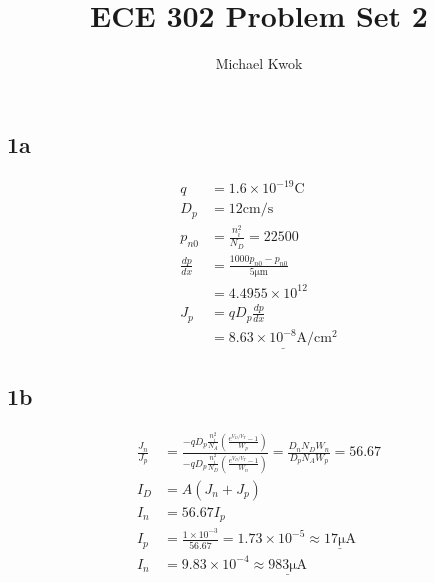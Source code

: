 \documentclass{article}
\title{ECE 302 Problem Set 2}
\author{Michael Kwok}
\begin{document}
\maketitle
\begin{multicols}{2}
    \subsection*{1a}
    \begin{align*}
        q             & = 1.6 \times 10^{-19}\si{\coulomb}                                    \\
        D_p           & = 12 \si{\centi\metre\per\second}                                     \\
        p_{n0}        & = \frac{n_i^2}{N_D} = 22500                                           \\
        \frac{dp}{dx} & = \frac{1000 p_{n0} - p_{n0}}{5\si{\micro\metre}}                     \\
                      & = 4.4955\times 10^{12}                                                \\
        J_p           & = q D_p \frac{dp}{dx}                                                 \\
                      & = \underline{8.63\times 10^{-8} \si{\ampere\per\centi\metre\squared}}
    \end{align*}
    \subsection*{1b}
    \begin{align*}
        \frac{J_n}{J_p} & = \frac{- q D_p \frac{n_i^2}{N_A}\left(\frac{e^{V_D/V_T} - 1}{W_p}\right)}{- q D_p \frac{n_i^2}{N_D}\left(\frac{e^{V_D/V_T} - 1}{W_n}\right)} = \frac{D_n N_D W_n}{D_p N_A W_p} = 56.67 \\
        I_D             & = A\left(J_n + J_p\right)                                                                                                                                                               \\
        I_n             & = 56.67 I_p                                                                                                                                                                             \\
        I_p             & = \frac{1\times 10^{-3}}{56.67} = 1.73\times 10^{-5} \approx \underline{17\si{\micro\ampere}}                                                                                           \\
        I_n             & = 9.83\times 10^{-4} \approx \underline{983 \si{\micro\ampere}}
    \end{align*}

\end{multicols}
\end{document}
